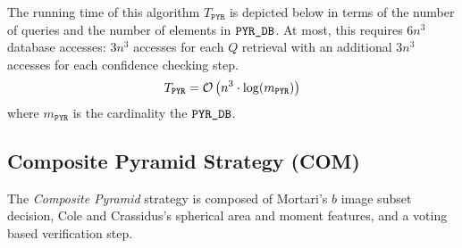 The running time of this algorithm $T_\texttt{PYR}$ is depicted below in terms of the number of queries and the number of elements in $\texttt{PYR\_DB}$.
At most, this requires $6n^3$ database accesses: $3n^3$ accesses for each $Q$ retrieval with an additional $3n^3$ accesses for each confidence checking step.
\begin{equation}
    T_{\texttt{PYR}} = \mathcal{O} \left( n^3 \cdot \log( m_\texttt{PYR} ) \right)
\end{equation}
where $m_\texttt{PYR}$ is the cardinality the $\texttt{PYR\_DB}$.



\subsection{Composite Pyramid Strategy (COM)}\label{subsec:compositePyramidMethod}
The \textit{Composite Pyramid} strategy is composed of Mortari's $b$ image subset decision, Cole and Crassidus's spherical area and moment features, and a voting based verification step.

